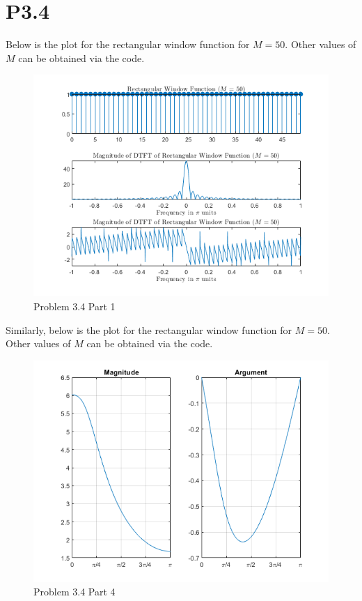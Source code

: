 \documentclass{article}
\begin{document}
\section*{P3.4}
Below is the plot for the rectangular window function for \(M = 50\). Other values of \(M\) can be obtained via the code.
\begin{figure}[H]
    \centering
    \includegraphics[width=\textwidth]{html/Homework3_07.png}
    \caption{Problem 3.4 Part 1}
    \label{3.4.1}
\end{figure}

Similarly, below is the plot for the rectangular window function for \(M = 50\). Other values of \(M\) can be obtained via the code.
\begin{figure}[H]
    \centering
    \includegraphics[width=\textwidth]{html/Homework3_17.png}
    \caption{Problem 3.4 Part 4}
    \label{3.4.4}
\end{figure}
\end{document}
